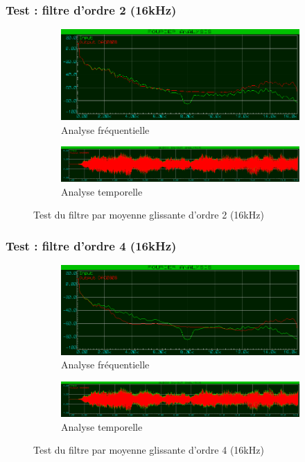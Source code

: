 \documentclass{article}
\begin{document}
    \subsubsection{Test : filtre d'ordre 2 (16kHz)}
    \begin{figure}[H]
        \centering
        \begin{subfigure}[b]{\textwidth}
            \centering
            \includegraphics[width=.6\textwidth]{./images/spectrum_mov_avg_2_16k.png}
            \caption{Analyse fréquentielle}
        \end{subfigure}
        \begin{subfigure}[b]{\textwidth}
            \centering
            \includegraphics[width=\textwidth]{./images/out_mov_avg_2_16k.png}
            \caption{Analyse temporelle}
        \end{subfigure}
        \caption{Test du filtre par moyenne glissante d'ordre 2 (16kHz)}
    \end{figure}

    \subsubsection{Test : filtre d'ordre 4 (16kHz)}
    \begin{figure}[H]
        \centering
        \begin{subfigure}[b]{\textwidth}
            \centering
            \includegraphics[width=.6\textwidth]{./images/spectrum_mov_avg_4_16k.png}
            \caption{Analyse fréquentielle}
        \end{subfigure}
        \begin{subfigure}[b]{\textwidth}
            \centering
            \includegraphics[width=\textwidth]{./images/out_mov_avg_4_16k.png}
            \caption{Analyse temporelle}
        \end{subfigure}
        \caption{Test du filtre par moyenne glissante d'ordre 4 (16kHz)}
    \end{figure}
\end{document}
